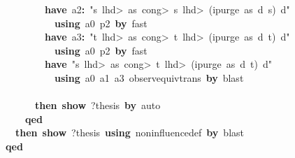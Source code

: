\documentclass{article}
\newcommand{\syntaxKEYWORDA}[1]{\textcolor[rgb]{0.0,0.4,0.6}{\textbf{#1}}}
\newcommand{\syntaxKEYWORDC}[1]{\textcolor[rgb]{0.0,0.6,1.0}{\textbf{#1}}}
\newcommand{\syntaxLITERALA}[1]{\textcolor[rgb]{1.0,0.0,0.8}{#1}}
\newcommand{\syntaxOPERATOR}[1]{\textcolor[rgb]{0.0,0.0,0.0}{\textbf{#1}}}
\newcommand{\syntaxKEYWORDA}[1]{\textcolor[rgb]{0.0,0.4,0.6}{\textbf{#1}}}
\newcommand{\syntaxKEYWORDC}[1]{\textcolor[rgb]{0.0,0.6,1.0}{\textbf{#1}}}
\newcommand{\syntaxLITERALA}[1]{\textcolor[rgb]{1.0,0.0,0.8}{#1}}
\newcommand{\syntaxOPERATOR}[1]{\textcolor[rgb]{0.0,0.0,0.0}{\textbf{#1}}}
\newcommand{\syntaxKEYWORDA}[1]{\textcolor[rgb]{0.0,0.4,0.6}{\textbf{#1}}}
\newcommand{\syntaxKEYWORDC}[1]{\textcolor[rgb]{0.0,0.6,1.0}{\textbf{#1}}}
\newcommand{\syntaxLITERALA}[1]{\textcolor[rgb]{1.0,0.0,0.8}{#1}}
\newcommand{\syntaxOPERATOR}[1]{\textcolor[rgb]{0.0,0.0,0.0}{\textbf{#1}}}
\newcommand{\syntaxKEYWORDA}[1]{\textcolor[rgb]{0.0,0.4,0.6}{#1}}
\newcommand{\syntaxKEYWORDC}[1]{\textcolor[rgb]{0.0,0.6,1.0}{#1}}
\newcommand{\syntaxLITERALA}[1]{\textcolor[rgb]{1.0,0.0,0.8}{\textbf{#1}}}
\newcommand{\syntaxOPERATOR}[1]{\textcolor[rgb]{0.0,0.0,0.0}{#1}}
\newcommand{\syntaxKEYWORDA}[1]{\textcolor[rgb]{0.0,0.4,0.6}{\textbf{#1}}}
\newcommand{\syntaxKEYWORDC}[1]{\textcolor[rgb]{0.0,0.6,1.0}{\textbf{#1}}}
\newcommand{\syntaxLITERALA}[1]{\textcolor[rgb]{1.0,0.0,0.8}{#1}}
\newcommand{\syntaxOPERATOR}[1]{\textcolor[rgb]{0.0,0.0,0.0}{\textbf{#1}}}
\newcommand{\syntaxKEYWORDA}[1]{\textcolor[rgb]{0.0,0.4,0.6}{\textbf{#1}}}
\newcommand{\syntaxKEYWORDC}[1]{\textcolor[rgb]{0.0,0.6,1.0}{\textbf{#1}}}
\newcommand{\syntaxLITERALA}[1]{\textcolor[rgb]{1.0,0.0,0.8}{#1}}
\newcommand{\syntaxOPERATOR}[1]{\textcolor[rgb]{0.0,0.0,0.0}{\textbf{#1}}}
\begin{document}
{\ }{\ }{\ }{\ }{\ }{\ }{\ }{\ }{\ }{\ }{\ }{\ }\syntaxKEYWORDA{have}{\ }a2\syntaxOPERATOR{:}{\ }\syntaxLITERALA{"s{\ }\<lhd>{\ }as{\ }\<cong>{\ }s{\ }\<lhd>{\ }(ipurge{\ }as{\ }d{\ }s){\ }\usebox{\atbox}{\ }d"}\hspace*{\fill}\\
{\ }{\ }{\ }{\ }{\ }{\ }{\ }{\ }{\ }{\ }{\ }{\ }{\ }{\ }\syntaxKEYWORDA{using}{\ }a0{\ }p2{\ }\syntaxKEYWORDA{by}{\ }fast\hspace*{\fill}\\
{\ }{\ }{\ }{\ }{\ }{\ }{\ }{\ }{\ }{\ }{\ }{\ }\syntaxKEYWORDA{have}{\ }a3\syntaxOPERATOR{:}{\ }\syntaxLITERALA{"t{\ }\<lhd>{\ }as{\ }\<cong>{\ }t{\ }\<lhd>{\ }(ipurge{\ }as{\ }d{\ }t){\ }\usebox{\atbox}{\ }d"}\hspace*{\fill}\\
{\ }{\ }{\ }{\ }{\ }{\ }{\ }{\ }{\ }{\ }{\ }{\ }{\ }{\ }\syntaxKEYWORDA{using}{\ }a0{\ }p2{\ }\syntaxKEYWORDA{by}{\ }fast\hspace*{\fill}\\
{\ }{\ }{\ }{\ }{\ }{\ }{\ }{\ }{\ }{\ }{\ }{\ }\syntaxKEYWORDA{have}{\ }\syntaxLITERALA{"s{\ }\<lhd>{\ }as{\ }\<cong>{\ }t{\ }\<lhd>{\ }(ipurge{\ }as{\ }d{\ }t){\ }\usebox{\atbox}{\ }d"}\hspace*{\fill}\\
{\ }{\ }{\ }{\ }{\ }{\ }{\ }{\ }{\ }{\ }{\ }{\ }{\ }{\ }\syntaxKEYWORDA{using}{\ }a0{\ }a1{\ }a3{\ }observ\usebox{\underscorebox}equiv\usebox{\underscorebox}trans{\ }\syntaxKEYWORDA{by}{\ }blast\hspace*{\fill}\\
{\ }{\ }{\ }{\ }{\ }{\ }{\ }{\ }{\ }{\ }{\ }{\ }\syntaxKEYWORDA{\usebox{\closecurlybracket}}\hspace*{\fill}\\
{\ }{\ }{\ }{\ }{\ }{\ }{\ }{\ }{\ }{\ }\syntaxKEYWORDA{then}{\ }\syntaxKEYWORDC{show}{\ }?thesis{\ }\syntaxKEYWORDA{by}{\ }auto\hspace*{\fill}\\
{\ }{\ }{\ }{\ }{\ }{\ }{\ }{\ }\syntaxKEYWORDA{qed}\hspace*{\fill}\\
{\ }{\ }{\ }{\ }{\ }{\ }\syntaxKEYWORDA{then}{\ }\syntaxKEYWORDC{show}{\ }?thesis{\ }\syntaxKEYWORDA{using}{\ }noninfluence\usebox{\underscorebox}def{\ }\syntaxKEYWORDA{by}{\ }blast\hspace*{\fill}\\
{\ }{\ }{\ }{\ }\syntaxKEYWORDA{qed}\hspace*{\fill}\\
\end{document}
